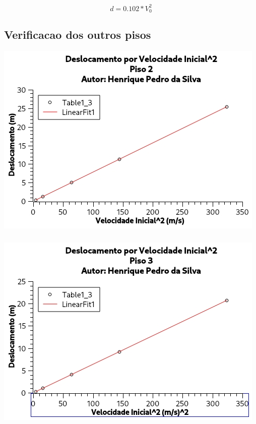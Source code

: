 \documentclass[12pt,twoside, a4paper, twocolumn]{article}
\begin{document}
\begin{equation}
    d = 0.102 * V_0^2
\end{equation}

\subsection{Verificacao dos outros pisos}

\begin{adjustbox}{scale=0.75}
    \includegraphics{Grafico-2.jpg}
\end{adjustbox}
\subparagraph*{}
\begin{adjustbox}{scale=0.75}
    \includegraphics{Grafico-3.jpg}
\end{adjustbox}
\subparagraph*{}
\end{document}
